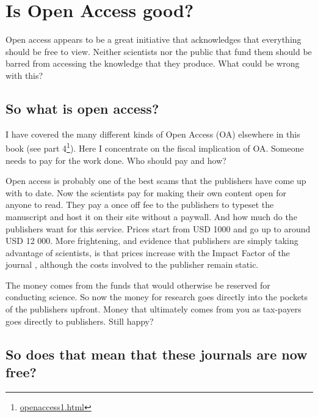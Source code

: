 \documentclass[
]{krantz}
\renewcommand{\href}[2]{#2\footnote{\url{#1}}}
\begin{document}
\hypertarget{openaccess}{%
\chapter{Is Open Access good?}\label{openaccess}}

Open access appears to be a great initiative that acknowledges that everything should be free to view. Neither scientists nor the public that fund them should be barred from accessing the knowledge that they produce. What could be wrong with this?

\hypertarget{so-what-is-open-access}{%
\section{So what is open access?}\label{so-what-is-open-access}}

I have covered the many different kinds of Open Access (OA) elsewhere in this book (\href{openaccess1.html}{see part 4}). Here I concentrate on the fiscal implication of OA. Someone needs to pay for the work done. Who should pay and how?

Open access is probably one of the best scams that the publishers have come up with to date. Now the scientists pay for making their own content open for anyone to read. They pay a once off fee to the publishers to typeset the manuscript and host it on their site without a paywall. And how much do the publishers want for this service. Prices start from USD 1000 and go up to around USD 12 000. More frightening, and evidence that publishers are simply taking advantage of scientists, is that prices increase with the Impact Factor of the journal \citep{gray2020sorry}, although the costs involved to the publisher remain static.

The money comes from the funds that would otherwise be reserved for conducting science. So now the money for research goes directly into the pockets of the publishers upfront. Money that ultimately comes from you as tax-payers goes directly to publishers. Still happy?

\hypertarget{so-does-that-mean-that-these-journals-are-now-free}{%
\section{So does that mean that these journals are now free?}\label{so-does-that-mean-that-these-journals-are-now-free}}
\end{document}
